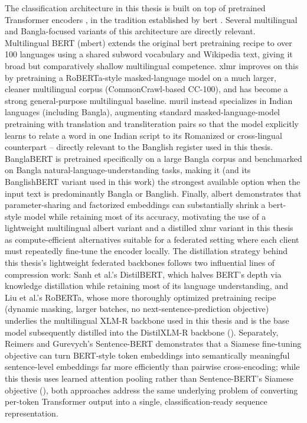 The classification architecture in this thesis is built on top of pretrained Transformer encoders \cite{vaswani2017attention}, in the tradition established by \gls{bert} \cite{devlin2019bert}. Several multilingual and Bangla-focused variants of this architecture are directly relevant. Multilingual BERT (\gls{mbert}) \cite{devlin2019bert} extends the original \gls{bert} pretraining recipe to over 100 languages using a shared subword vocabulary and Wikipedia text, giving it broad but comparatively shallow multilingual competence. \gls{xlmr} \cite{conneau2020xlmr} improves on this by pretraining a RoBERTa-style masked-language model on a much larger, cleaner multilingual corpus (CommonCrawl-based CC-100), and has become a strong general-purpose multilingual baseline. \gls{muril} \cite{khanuja2021muril} instead specializes in Indian languages (including Bangla), augmenting standard masked-language-model pretraining with translation and transliteration pairs so that the model explicitly learns to relate a word in one Indian script to its Romanized or cross-lingual counterpart -- directly relevant to the Banglish register used in this thesis. BanglaBERT \cite{bhattacharjee2022banglabert} is pretrained specifically on a large Bangla corpus and benchmarked on Bangla natural-language-understanding tasks, making it (and its BanglishBERT variant used in this work) the strongest available option when the input text is predominantly Bangla or Banglish. Finally, \gls{albert} \cite{lan2020albert} demonstrates that parameter-sharing and factorized embeddings can substantially shrink a \gls{bert}-style model while retaining most of its accuracy, motivating the use of a lightweight multilingual \gls{albert} variant and a distilled \gls{xlmr} variant in this thesis as compute-efficient alternatives suitable for a federated setting where each client must repeatedly fine-tune the encoder locally. The distillation strategy behind this thesis's lightweight federated backbones follows two influential lines of compression work: Sanh et al.'s \cite{sanh2019distilbert} DistilBERT, which halves BERT's depth via knowledge distillation while retaining most of its language understanding, and Liu et al.'s \cite{liu2019roberta} RoBERTa, whose more thoroughly optimized pretraining recipe (dynamic masking, larger batches, no next-sentence-prediction objective) underlies the multilingual XLM-R backbone used in this thesis and is the base model subsequently distilled into the DistilXLM-R backbone (). Separately, Reimers and Gurevych's \cite{reimers2019sentence} Sentence-BERT demonstrates that a Siamese fine-tuning objective can turn BERT-style token embeddings into semantically meaningful sentence-level embeddings far more efficiently than pairwise cross-encoding; while this thesis uses learned attention pooling rather than Sentence-BERT's Siamese objective (), both approaches address the same underlying problem of converting per-token Transformer output into a single, classification-ready sequence representation.
